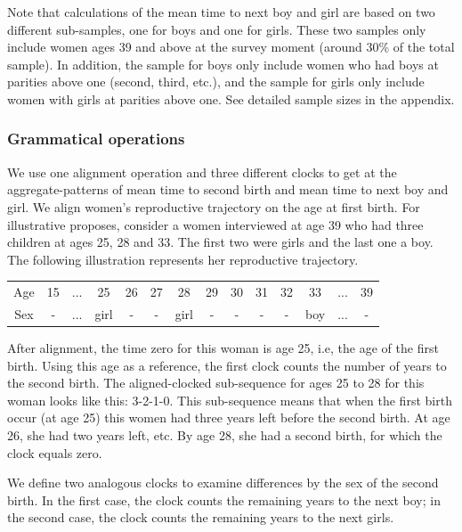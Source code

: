 \documentclass{article}
\begin{document}
Note that calculations of the mean time to next boy and girl are based on two different sub-samples, one for boys and one for girls. These two samples only include women ages 39 and above at the survey moment (around 30\% of the total sample). In addition, the sample for boys only include women who had boys at parities above one (second, third, etc.), and the sample for girls only include women with girls at parities above one. See detailed sample sizes in the appendix.

\subsubsection{Grammatical operations}

We use one alignment operation and three different clocks to get at the aggregate-patterns of mean time to second birth and mean time to next boy and girl. We align women's reproductive trajectory on the age at first birth. For illustrative proposes, consider a women interviewed at age 39 who had three children at ages 25, 28 and 33. The first two were girls and the last one a boy. The following illustration represents her reproductive trajectory.

\begin{center}
\begin{tabular}{c|ccccccccccccc}
\hline
    Age & 15 & $...$ & 25 & 26 & 27 & 28 & 29 & 30 & 31 & 32 & 33 & $...$ & 39 \\
    Sex & - & $...$ & girl & - & - & girl & - & - & - & - & boy & $...$ & - \\\hline
\end{tabular}
\end{center}

After alignment, the time zero for this woman is age 25, i.e, the age of the first birth. Using this age as a reference, the first clock counts the number of years to the second birth. The aligned-clocked sub-sequence for ages 25 to 28 for this woman looks like this: 3-2-1-0. This sub-sequence means that when the first birth occur (at age 25) this women had three years left before the second birth. At age 26, she had two years left, etc. By age 28, she had a second birth, for which the clock equals zero.

We define two analogous clocks to examine differences by the sex of the second birth. In the first case, the clock counts the remaining years to the next boy; in the second case, the clock counts the remaining years to the next girls. 
\end{document}
